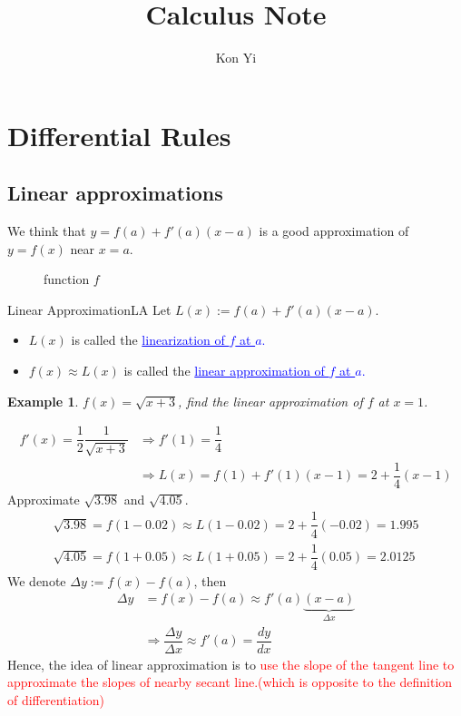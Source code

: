 \documentclass[12pt,a4paper]{article}
\title{Calculus Note}
\author{Kon Yi}
\theoremstyle{mystyle}
\numberwithin{figure}{subsection}
\newtheorem{exm}{Example}[subsection] %
\newenvironment{ex}{\begin{exBox}\begin{exm}}{\end{exm}\end{exBox}}
\begin{document}
\maketitle
\section{Differential Rules}
\subsection{Linear approximations}
We think that $y=f(a)+f'(a)(x-a)$ is a good approximation of $y=f(x)$ near $x=a$.
\begin{figure}[h]
    \centering
    
    \caption{function $f$}
    \label{fig:3.10.1}
\end{figure}
\begin{df}{Linear Approximation}{LA}
Let $L(x) := f(a) + f'(a)(x-a).$
\begin{itemize}
    \item $L(x)$ is called the \textcolor{blue}{\underline{linearization of $f$ at $a$}.}
    \item $f(x) \approx L(x)$ is called the \textcolor{blue}{\underline{linear approximation of $f$ at $a$}.}
\end{itemize}
\end{df}
\begin{ex}
$f(x) = \sqrt{x+3}$, find the linear approximation of $f$ at $x=1$.
\end{ex}
\begin{align*}
f'(x) = \dfrac{1}{2}\dfrac{1}{\sqrt{x+3}} &\Rightarrow f'(1) = \dfrac{1}{4} \\
&\Rightarrow L(x) = f(1) + f'(1)(x-1) = 2 + \dfrac{1}{4}(x-1)
\end{align*}
Approximate $\sqrt{3.98}$ and $\sqrt{4.05}$.
\begin{align*}
\sqrt{3.98} = f(1-0.02) \approx L(1-0.02) = 2+\dfrac{1}{4}(-0.02)= 1.995 \\
\sqrt{4.05} = f(1+0.05)\approx L(1+0.05)=2+\dfrac{1}{4}(0.05)=2.0125
\end{align*}
We denote $\Delta y := f(x)-f(a)$, then
\begin{align*}
    \Delta y &= f(x) - f(a) \approx f'(a)\underbrace{(x-a)}_{\Delta x} \\
    &\Rightarrow \dfrac{\Delta y}{\Delta x} \approx f'(a) = \dfrac{dy}{dx}
\end{align*}
Hence, the idea of linear approximation is to \textcolor{red}{use the slope of the tangent line to approximate the slopes of nearby secant line.(which is opposite to the definition of differentiation)}
\end{document}
